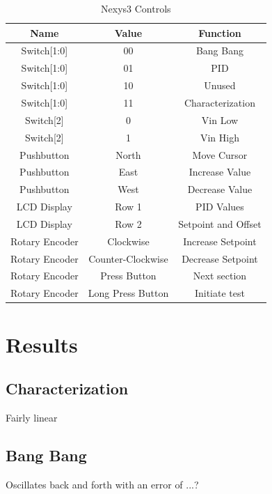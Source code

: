 \documentclass[11pt]{article}
\begin{document}
 
	\begin {table}[h!]
	\begin {center} 
	\vspace{15pt}
	
	\begin{tabular}{||c|c|c||}\hline	
		\textbf{Name}	&	\textbf{Value}	&	\textbf{Function}		\\\hline
		Switch[1:0]		&	00		&	Bang Bang 		\\\hline
		Switch[1:0]		&	01		&	PID 		\\\hline
		Switch[1:0]		&	10		&	Unused	 	\\\hline
		Switch[1:0]		&	11		&	Characterization 		\\\hline
		Switch[2]		&	0		&	Vin Low		\\\hline
		Switch[2]		&	1		&	Vin High	\\\hline
		Pushbutton		&	North	&	Move Cursor		\\\hline
		Pushbutton		&	East	&	Increase Value		\\\hline
		Pushbutton		&	West	&	Decrease Value		\\\hline
		LCD Display 	&	Row 1	&	PID Values	\\\hline
		LCD Display 	&	Row 2	&	Setpoint and Offset	\\\hline
		Rotary Encoder	& Clockwise	& 	Increase Setpoint		\\\hline
		Rotary Encoder	& Counter-Clockwise	& 	Decrease Setpoint		\\\hline
		Rotary Encoder	& Press Button		& 	Next section \\\hline
		Rotary Encoder	& Long Press Button	& 	Initiate test \\\hline
		
	\end{tabular}
		\caption {Nexys3 Controls} \label{controls}
	\end{center}
	\end{table} 		
  

\section{Results}

\subsection{Characterization}
Fairly linear
\subsection{Bang Bang}
Oscillates back and forth with an error of ...?
\end{document}
